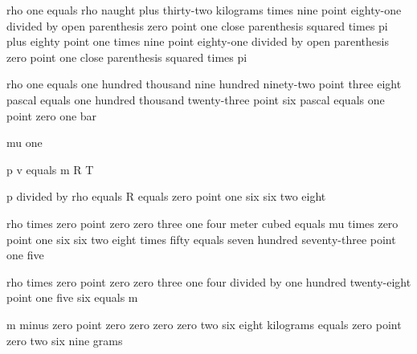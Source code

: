 rho one equals rho naught plus thirty-two kilograms times nine point eighty-one divided by open parenthesis zero point one close parenthesis squared times pi plus eighty point one times nine point eighty-one divided by open parenthesis zero point one close parenthesis squared times pi

rho one equals one hundred thousand nine hundred ninety-two point three eight pascal equals one hundred thousand twenty-three point six pascal equals one point zero one bar

mu one

p v equals m R T

p divided by rho equals R equals zero point one six six two eight

rho times zero point zero zero three one four meter cubed equals mu times zero point one six six two eight times fifty equals seven hundred seventy-three point one five

rho times zero point zero zero three one four divided by one hundred twenty-eight point one five six equals m

m minus zero point zero zero zero zero two six eight kilograms equals zero point zero two six nine grams